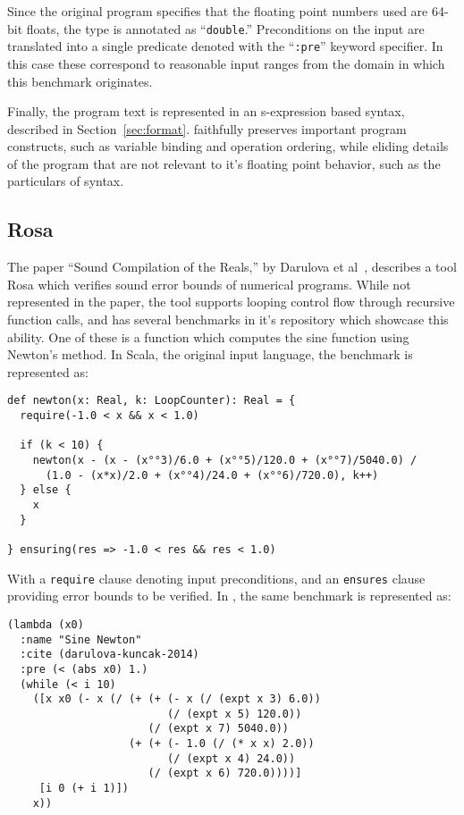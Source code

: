 \documentclass[main.tex]{subfiles}
\begin{document}
Since the original program specifies that the floating point numbers
used are 64-bit floats, the type is annotated as ``\verb|double|.''
Preconditions on the input are translated into a single predicate
denoted with the ``\verb|:pre|'' keyword specifier. In this case these
correspond to reasonable input ranges from the domain in which this
benchmark originates.

Finally, the program text is represented in \core an s-expression
based syntax, described in Section~\ref{sec:format}. \core faithfully
preserves important program constructs, such as variable binding and
operation ordering, while eliding details of the program that are not
relevant to it's floating point behavior, such as the particulars of
syntax.

\subsection{Rosa}
The paper ``Sound Compilation of the Reals,'' by Darulova et
al~\cite{DarulovaK14}, describes a tool Rosa which verifies sound
error bounds of numerical programs. While not represented in the
paper, the tool supports looping control flow through recursive
function calls, and has several benchmarks in it's repository which
showcase this ability. One of these is a function which computes the
sine function using Newton's method. In Scala, the original input
language, the benchmark is represented as:

\begin{verbatim}
def newton(x: Real, k: LoopCounter): Real = {
  require(-1.0 < x && x < 1.0)

  if (k < 10) {
    newton(x - (x - (x°°3)/6.0 + (x°°5)/120.0 + (x°°7)/5040.0) / 
      (1.0 - (x*x)/2.0 + (x°°4)/24.0 + (x°°6)/720.0), k++)
  } else {
    x
  }
  
} ensuring(res => -1.0 < res && res < 1.0)
\end{verbatim}

With a \verb|require| clause denoting input preconditions, and an
\verb|ensures| clause providing error bounds to be verified. In
\name, the same benchmark is represented as:

\begin{verbatim}
(lambda (x0)
  :name "Sine Newton"
  :cite (darulova-kuncak-2014)
  :pre (< (abs x0) 1.)
  (while (< i 10)
    ([x x0 (- x (/ (+ (+ (- x (/ (expt x 3) 6.0)) 
                         (/ (expt x 5) 120.0))
                      (/ (expt x 7) 5040.0))
                   (+ (+ (- 1.0 (/ (* x x) 2.0)) 
                         (/ (expt x 4) 24.0)) 
                      (/ (expt x 6) 720.0))))]
     [i 0 (+ i 1)])
    x))
\end{verbatim}
\end{document}
